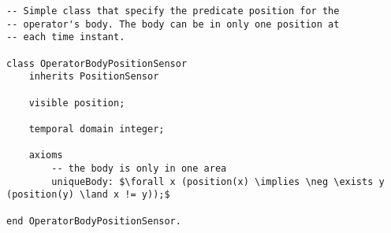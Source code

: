 \begin{lstlisting}[fontadjust, mathescape, frame=single] 
-- Simple class that specify the predicate position for the 
-- operator's body. The body can be in only one position at
-- each time instant.

class OperatorBodyPositionSensor
    inherits PositionSensor

    visible position;

    temporal domain integer;

    axioms
        -- the body is only in one area
        uniqueBody: $\forall x (position(x) \implies \neg \exists y (position(y) \land x != y));$

end OperatorBodyPositionSensor.
\end{lstlisting}